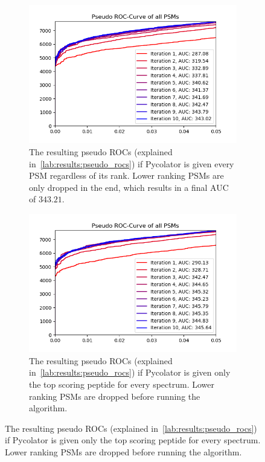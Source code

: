 \begin{figure}
	\normalsize
	\centering
	\begin{subfigure}{0.49\textwidth}
		\includegraphics[width = \textwidth]{figures/allRanks.png}
		\caption[Result of dropping lower ranks at the end]{The resulting pseudo ROCs (explained in~\ref{lab:results:pseudo_rocs}) if Pycolator is given every PSM regardless of its rank. Lower ranking PSMs are only dropped in the end, which results in a final AUC of $343.21$.}
		\label{fig:all_ranks}
	\end{subfigure}
	\hfill
	\begin{subfigure}{0.49\textwidth}
		\includegraphics[width = \textwidth]{figures/onlyFirstRank.png}
		\caption[Result of dropping lower ranks at the start]{The resulting pseudo ROCs (explained in~\ref{lab:results:pseudo_rocs}) if Pycolator is given only the top scoring peptide for every spectrum. Lower ranking PSMs are dropped before running the algorithm.}

\end{subfigure}
\end{figure}
